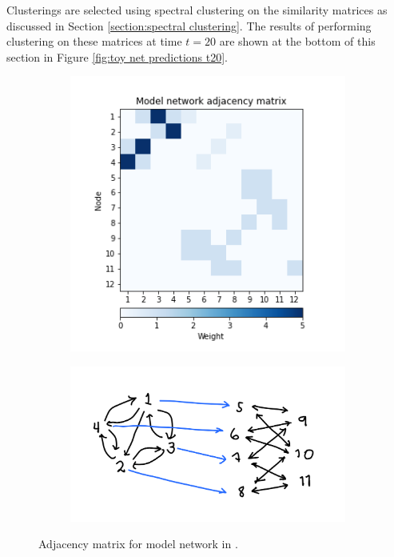 \documentclass[12pt,a4paper]{article}
\begin{document}
\noindent Clusterings are selected using spectral clustering on the similarity matrices as discussed in Section \ref{section:spectral clustering}. The results of performing clustering on these matrices at time $t=20$ are shown at the bottom of this section in Figure \ref{fig:toy net predictions t20}.

\begin{figure}[H]
\centering
\begin{subfigure}[b]{0.35\linewidth}
  \centering
  \includegraphics[width=\textwidth]{toy_net/toy net adjacency matrix.png}
  \caption{}
  \label{fig:toy net diagram}
\end{subfigure}
\hfill
\begin{subfigure}[b]{0.5\linewidth}
  \centering
  \includegraphics[width=\textwidth]{toy_net/toy_net_diagram.png}
  \caption{}
  \label{fig:toy net adjacency matrix}
\end{subfigure}
\caption{Adjacency matrix for model network in \cite{schaub2019multiscale}.}
\label{fig:toy net}
\end{figure}
\end{document}
